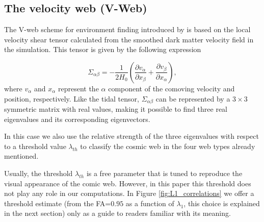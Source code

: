\documentclass[a4,useAMS,usenatbib,usegraphicx]{mn2e}
\newcommand{\pr}[1]{ \left( #1 \right) }
\newcommand{\eq}[2]{\begin{equation} \label{eq:#1} #2 \end{equation}}
\begin{document}
\subsection{The velocity web (V-Web)}
\label{subsec:Vweb}

The V-web scheme for environment finding introduced by
\cite{Hoffman12} is based on the local velocity shear tensor
calculated from the smoothed dark matter  velocity field in the
simulation. 
This tensor is given by the  following expression

\eq{V_web}
{	\Sigma_{\alpha\beta} = -\frac{1}{2H_0}\pr{\frac{\partial v_{\alpha}}
{\partial x_{\beta}}+\frac{\partial v_{\beta}}{\partial x_{\alpha}}},}
where $v_{\alpha}$ and $x_{\alpha}$ represent the $\alpha$ component of 
the comoving velocity and position, respectively. Like the tidal tensor, 
$\Sigma_{\alpha\beta}$ can be represented by a $3\times 3$ symmetric 
matrix with real values, making it possible to find three real
eigenvalues and its corresponding eigenvectors.


In this case we also use the relative strength of the three eigenvalues with 
respect to a threshold value $\lambda_{th}$ to classify the cosmic web
in the four web types already mentioned.


Usually, the threshold $\lambda_{th}$ is a free parameter that is
tuned to reproduce the visual appearance of the comic web. 
However, in this paper this threshold does not play any role in our
computations.
In Figure \ref{fig:L1_correlations} we offer a threshold estimate
(from the FA=$0.95$ as a function of $\lambda_1$, this choice is
explained in the next section) only as a guide to readers familiar
with its meaning.  
\end{document}
